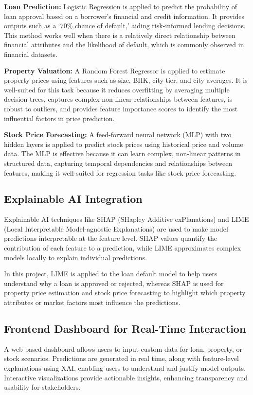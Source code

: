 \textbf{Loan Prediction:} Logistic Regression is applied to predict the probability of loan approval based on a borrower's financial and credit information. It provides outputs such as a `70\% chance of default,' aiding risk-informed lending decisions. This method works well when there is a relatively direct relationship between financial attributes and the likelihood of default, which is commonly observed in financial datasets.

\textbf{Property Valuation:} A Random Forest Regressor is applied to estimate property prices using features such as size, BHK, city tier, and city averages. It is well-suited for this task because it reduces overfitting by averaging multiple decision trees, captures complex non-linear relationships between features, is robust to outliers, and provides feature importance scores to identify the most influential factors in price prediction.

\textbf{Stock Price Forecasting:} A feed-forward neural network (MLP) with two hidden layers is applied to predict stock prices using historical price and volume data. The MLP is effective because it can learn complex, non-linear patterns in structured data, capturing temporal dependencies and relationships between features, making it well-suited for regression tasks like stock price forecasting.

\subsection{Explainable AI Integration}

Explainable AI techniques like SHAP (SHapley Additive exPlanations) and LIME (Local Interpretable Model-agnostic Explanations) are used to make model predictions interpretable at the feature level. SHAP values quantify the contribution of each feature to a prediction, while LIME approximates complex models locally to explain individual predictions.

In this project, LIME is applied to the loan default model to help users understand why a loan is approved or rejected, whereas SHAP is used for property price estimation and stock price forecasting to highlight which property attributes or market factors most influence the predictions.

\subsection{Frontend Dashboard for Real-Time Interaction}

A web-based dashboard allows users to input custom data for loan, property, or stock scenarios. Predictions are generated in real time, along with feature-level explanations using XAI, enabling users to understand and justify model outputs. Interactive visualizations provide actionable insights, enhancing transparency and usability for stakeholders.
